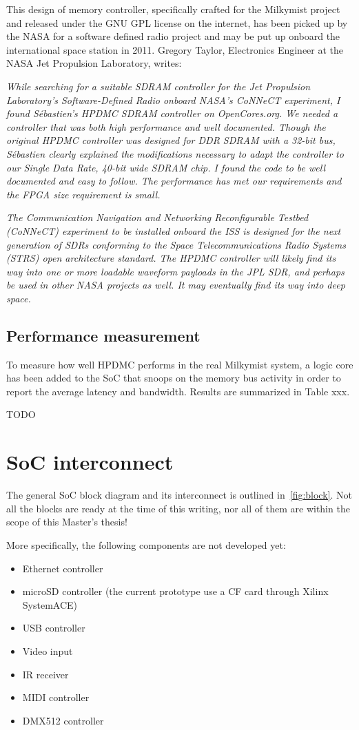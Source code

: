\documentclass[a4paper,11pt]{kthesis}
\begin{document}
This design of memory controller, specifically crafted for the Milkymist project and released under the GNU GPL license on the internet, has been picked up by the NASA for a software defined radio project and may be put up onboard the international space station in 2011. Gregory Taylor, Electronics Engineer at the NASA Jet Propulsion Laboratory, writes:

\textit{While searching for a suitable SDRAM controller for the Jet Propulsion Laboratory's Software-Defined Radio onboard NASA's CoNNeCT experiment, I found S\'ebastien's HPDMC SDRAM controller on OpenCores.org. We needed a controller that was both high performance and well documented. Though the original HPDMC controller was designed for DDR SDRAM with a 32-bit bus, S\'ebastien clearly explained the modifications necessary to adapt the controller to our Single Data Rate, 40-bit wide SDRAM chip. I found the code to be well documented and easy to follow. The performance has met our requirements and the FPGA size requirement is small.}

\textit{The Communication Navigation and Networking Reconfigurable Testbed (CoNNeCT) experiment to be installed onboard the ISS is designed for the next generation of SDRs conforming to the Space Telecommunications Radio Systems (STRS) open architecture standard. The HPDMC controller will likely find its way into one or more loadable waveform payloads in the JPL SDR, and perhaps be used in other NASA projects as well. It may eventually find its way into deep space.}

\section{Performance measurement}
To measure how well HPDMC performs in the real Milkymist system, a logic core has been added to the SoC that snoops on the memory bus activity in order to report the average latency and bandwidth. Results are summarized in Table xxx.

TODO

\chapter{SoC interconnect}
The general SoC block diagram and its interconnect is outlined in~\ref{fig:block}. Not all the blocks are ready at the time of this writing, nor all of them are within the scope of this Master's thesis!

More specifically, the following components are not developed yet:
\begin{itemize}
\item Ethernet controller
\item microSD controller (the current prototype use a CF card through Xilinx SystemACE)
\item USB controller
\item Video input
\item IR receiver
\item MIDI controller
\item DMX512 controller
\end{itemize}
\end{document}
